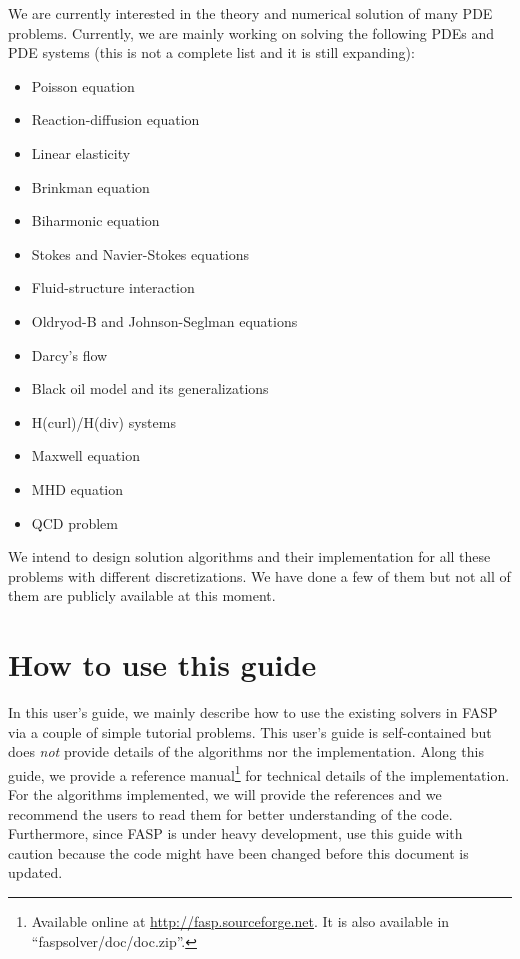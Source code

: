 \documentclass[11pt]{memoir}
\begin{document}
We are currently interested in the theory and numerical solution of many PDE problems. Currently, we are mainly working on solving the following PDEs and PDE systems (this is not a complete list and it is still expanding):
\begin{itemize}
\item Poisson equation
\item Reaction-diffusion equation
\item Linear elasticity
\item Brinkman equation
\item Biharmonic equation
\item Stokes and Navier-Stokes equations
\item Fluid-structure interaction
\item Oldryod-B and Johnson-Seglman equations
\item Darcy's flow
\item Black oil model and its generalizations
\item H(curl)/H(div) systems
\item Maxwell equation
\item MHD equation
\item QCD problem
\end{itemize}
%
We intend to design solution algorithms and their implementation for all these problems with different discretizations. We have done a few of them but not all of them are publicly available at this moment. 


\section{How to use this guide}\label{sec:how}

In this user's guide, we mainly describe how to use the existing solvers in FASP via a couple of simple tutorial problems. This user's guide is self-contained but does \emph{not} provide details of the algorithms nor the implementation. Along this guide, we provide a reference manual\footnote{Available online at \url{http://fasp.sourceforge.net}. It is also available in ``faspsolver/doc/doc.zip''.} for technical details of the implementation. For the algorithms implemented, we will provide the references and we recommend the users to read them for better understanding of the code. Furthermore, since FASP is under heavy development, use this guide with caution because the code might have been changed before this document is updated. 
\end{document}
